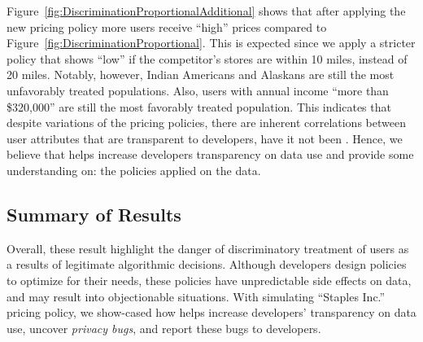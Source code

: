 Figure~\ref{fig:DiscriminationProportionalAdditional} shows that after
applying the new  pricing policy more users receive ``high'' prices
compared to Figure~\ref{fig:DiscriminationProportional}. This is expected
since we apply a stricter policy that shows ``low'' if the competitor's
stores are within 10 miles,  instead of 20 miles. Notably, however, Indian Americans
and Alaskans are still the most unfavorably treated populations. Also, users
with annual income ``more than \$320,000'' are still the most favorably treated
population. This indicates that despite variations of the pricing policies,
there are inherent correlations between user attributes that are transparent
to developers, have it not been \sysname. Hence, we believe that \sysname
helps increase developers transparency on data use and provide some understanding
on: the policies applied on the data.


\subsection{\normalsize Summary of Results}
Overall, these result highlight the danger of discriminatory treatment of
users as a results of legitimate algorithmic decisions. Although developers
design policies to optimize for their needs, these policies have unpredictable
side effects on data, and may result into objectionable situations. With simulating
``Staples Inc.'' pricing policy, we show-cased how \sysname helps increase
developers' transparency on data use, uncover {\em privacy bugs}, and report
these bugs to developers.

\begin{figure*}[t]
{
  \caption{\textbf{Prices shown to users and their dependency on income,
          race, and sex.} Shows the proportion of high versus low
          prices shown to users based on (a) income, (b) race, and (c) sex.
          In this case, the pricing policy is stricter and results to ``low''
          prices if user's distance from a competitor's store is less than 10
          miles. Figure (a) reveals that a users with annual income less than
          \$5,000 still receives proportionally more high prices than a user with
          annual income more than \$320,000. Figure (b) indicates that an
          Indian American or an Alaskan users still receives notably more high
          prices than any other user. Figure (c) shows that male and female
          users receive approximately the same proportion of high versus
          low prices.
  }
  \label{fig:DiscriminationProportionalAdditional}
}
\end{figure*}
